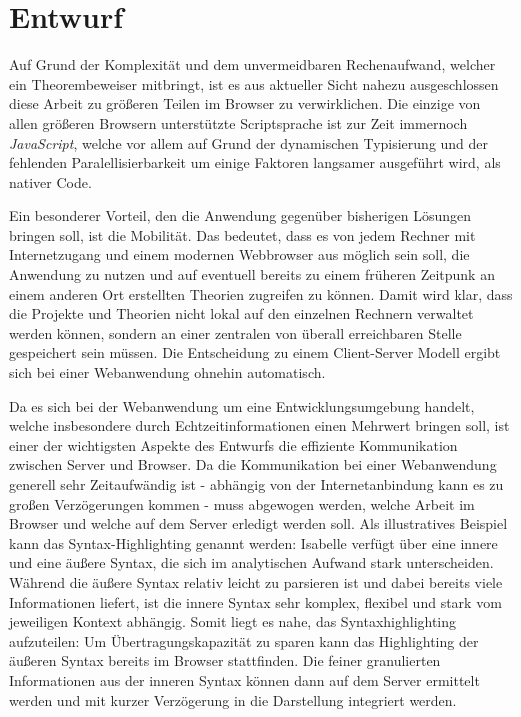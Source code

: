 \chapter{Entwurf}

Auf Grund der Komplexität und dem unvermeidbaren Rechenaufwand, welcher ein Theorembeweiser
mitbringt, ist es aus aktueller Sicht nahezu ausgeschlossen diese Arbeit zu größeren Teilen im
Browser zu verwirklichen. Die einzige von allen größeren Browsern unterstützte Scriptsprache ist zur
Zeit immernoch \textit{JavaScript}, welche vor allem auf Grund der dynamischen Typisierung und der
fehlenden Paralellisierbarkeit um einige Faktoren langsamer ausgeführt wird, als nativer Code.

Ein besonderer Vorteil, den die Anwendung gegenüber bisherigen Lösungen bringen soll, ist die
Mobilität. Das bedeutet, dass es von jedem Rechner mit Internetzugang und einem modernen Webbrowser
aus möglich sein soll, die Anwendung zu nutzen und auf eventuell bereits zu einem früheren Zeitpunk
an einem anderen Ort erstellten Theorien zugreifen zu können. Damit wird klar, dass die Projekte und
Theorien nicht lokal auf den einzelnen Rechnern verwaltet werden können, sondern an einer zentralen
von überall erreichbaren Stelle gespeichert sein müssen. Die Entscheidung zu einem Client-Server
Modell ergibt sich bei einer Webanwendung ohnehin automatisch.

Da es sich bei der Webanwendung um eine Entwicklungsumgebung handelt, welche insbesondere durch
Echtzeitinformationen einen Mehrwert bringen soll, ist einer der wichtigsten Aspekte des Entwurfs
die effiziente Kommunikation zwischen Server und Browser. Da die Kommunikation bei einer
Webanwendung generell sehr Zeitaufwändig ist - abhängig von der Internetanbindung kann es zu großen
Verzögerungen kommen - muss abgewogen werden, welche Arbeit im Browser und welche auf dem Server
erledigt werden soll. Als illustratives Beispiel kann das Syntax-Highlighting genannt werden:
Isabelle verfügt über eine innere und eine äußere Syntax, die sich im analytischen Aufwand stark
unterscheiden. Während die äußere Syntax relativ leicht zu parsieren ist und dabei bereits viele
Informationen liefert, ist die innere Syntax sehr komplex, flexibel und stark vom jeweiligen Kontext
abhängig. Somit liegt es nahe, das Syntaxhighlighting aufzuteilen: Um Übertragungskapazität zu
sparen kann das Highlighting der äußeren Syntax bereits im Browser stattfinden. Die feiner
granulierten Informationen aus der inneren Syntax können dann auf dem Server ermittelt werden und
mit kurzer Verzögerung in die Darstellung integriert werden.

